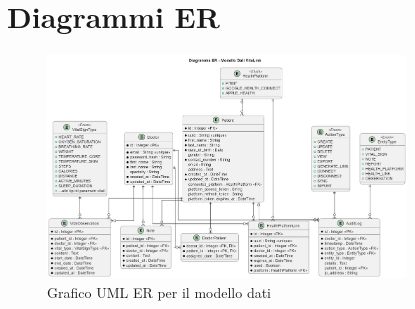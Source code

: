 \documentclass[12pt,a4paper,oneside]{report}
\begin{document}
\section{Diagrammi ER}
\begin{figure}[H]
    \centering
    \includegraphics[width=0.85\textwidth]{images/uml/DataModel.png}
    \caption{Grafico UML ER per il modello dati}
    \label{fig:uml-ER-graph}
\end{figure}
\end{document}

